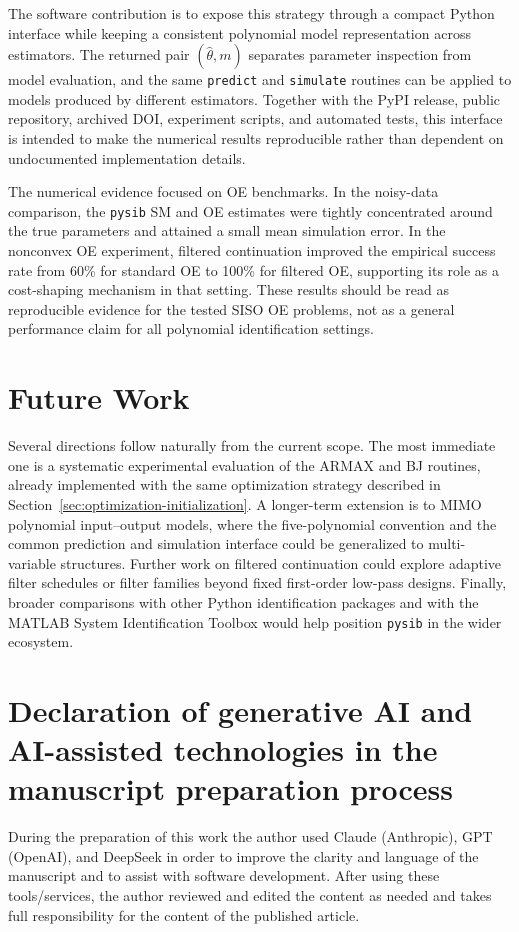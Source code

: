 \documentclass{ifacconf}
\begin{document}
The software contribution is to expose this strategy through a compact Python
interface while keeping a consistent polynomial model representation across
estimators.  The returned pair \((\hat\theta,m)\) separates parameter inspection
from model evaluation, and the same \texttt{predict} and \texttt{simulate}
routines can be applied to models produced by different estimators.  Together
with the PyPI release, public repository, archived DOI, experiment scripts, and
automated tests, this interface is intended to make the numerical results
reproducible rather than dependent on undocumented implementation details.

The numerical evidence focused on OE benchmarks.  In the noisy-data comparison,
the \texttt{pysib} SM and OE estimates were tightly concentrated around the true
parameters and attained a small mean simulation error.  In the nonconvex OE
experiment, filtered continuation improved the empirical success rate from 60\%
for standard OE to 100\% for filtered OE, supporting its role as a cost-shaping
mechanism in that setting.  These results should be read as reproducible
evidence for the tested SISO OE problems, not as a general performance claim for
all polynomial identification settings.

\section*{Future Work}

Several directions follow naturally from the current scope.  The most immediate
one is a systematic experimental evaluation of the ARMAX and BJ routines, already
implemented with the same optimization strategy described in
Section~\ref{sec:optimization-initialization}.  A longer-term extension is to
MIMO polynomial input--output models, where the five-polynomial convention and
the common prediction and simulation interface could be generalized to
multi-variable structures.  Further work on filtered continuation could explore
adaptive filter schedules or filter families beyond fixed first-order low-pass
designs.  Finally, broader comparisons with other Python
identification packages and with the MATLAB System Identification Toolbox would
help position \texttt{pysib} in the wider ecosystem.

\section*{Declaration of generative AI and AI-assisted technologies in the manuscript preparation process}

During the preparation of this work the author used Claude (Anthropic), GPT
(OpenAI), and DeepSeek in order to improve the clarity and language of the
manuscript and to assist with software development.  After using these
tools/services, the author reviewed and edited the content as needed and takes
full responsibility for the content of the published article.



\end{document}
